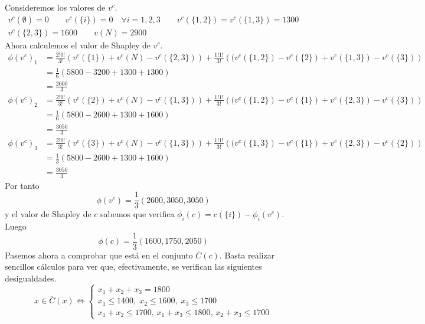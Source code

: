 \documentclass[twoside]{article}
\begin{document}
\begin{solucion}
Consideremos  los valores de $v^c$.
\begin{gather*}
v^c(\emptyset) = 0 \qquad v^c(\{i\}) = 0 \quad \forall i = 1,2,3 \qquad  v^c(\{1,2\}) = v^c(\{1,3\}) = 1300\\
v^c(\{2,3\}) = 1600 \qquad v(N)=2900
\end{gather*}
Ahora calculemos el valor de Shapley de $v^c$. 
\begin{align*}
\phi(v^c)_1& = \frac{2!0!}{3!}(v^c(\{1\})+ v^c(N) -v^c(\{2,3\})) + \frac{1!1!}{3!}\left((v^c(\{1,2\})-v^c(\{2\}) + v^c(\{1,3\})-v^c(\{3\}) \right)\\
&= \frac{1}{6}(5800-3200 + 1300 + 1300)\\& = \frac{2600}{3}\\
\phi(v^c)_2& = \frac{2!0!}{3!}(v^c(\{2\})+ v^c(N) -v^c(\{1,3\})) + \frac{1!1!}{3!}\left((v^c(\{1,2\})-v^c(\{1\}) + v^c(\{2,3\})-v^c(\{3\}) \right)\\
&= \frac{1}{6}(5800-2600 + 1300 + 1600)\\& = \frac{3050}{3}\\
\phi(v^c)_3& = \frac{2!0!}{3!}(v^c(\{3\})+ v^c(N) -v^c(\{1,3\})) + \frac{1!1!}{3!}\left((v^c(\{1,3\})-v^c(\{1\}) + v^c(\{2,3\})-v^c(\{2\}) \right)\\
&= \frac{1}{3}(5800-2600 + 1300 + 1600)\\& = \frac{3050}{3}
\end{align*}
Por tanto
$$
\phi(v^c) = \frac{1}{3}(2600,3050,3050)
$$
y el valor de Shapley de $c$ sabemos que verifica $\phi_i(c) = c(\{i\}) - \phi_i(v^c)$. Luego 
$$
\phi(c)= \frac{1}{3}(1600,1750,2050)
$$
Pasemos ahora a comprobar que está en el conjunto $\overline{C}(c)$.  Basta realizar sencillos cálculos para ver que, efectivamente, se verifican las siguientes desigualdades.
$$
x\in \overline{C}(x) \Leftrightarrow \begin{cases}
x_1+x_2+x_3 = 1800\\
x_1\leq 1400, \; x_2 \leq 1600, \; x_3 \leq 1700\\
x_1+x_2 \leq 1700,\, x_1+x_3 \leq 1800,\, x_2+x_3 \leq 1700
\end{cases}
$$
\end{solucion}
\newpage
\end{document}
